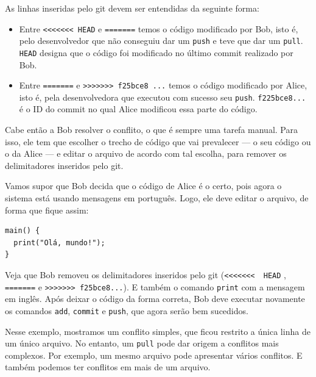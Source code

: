\documentclass[
  11pt,
  twoside]{book}
\newcommand{\passthrough}[1]{#1}
\begin{document}
As linhas inseridas pelo git devem ser entendidas da seguinte forma:

\begin{itemize}
\item
  Entre \passthrough{\lstinline!<<<<<<< HEAD!} e
  \passthrough{\lstinline!=======!} temos o código modificado por Bob,
  isto é, pelo desenvolvedor que não conseguiu dar um
  \passthrough{\lstinline!push!} e teve que dar um
  \passthrough{\lstinline!pull!}. \passthrough{\lstinline!HEAD!} designa
  que o código foi modificado no último commit realizado por Bob.
\item
  Entre \passthrough{\lstinline!=======!} e
  \passthrough{\lstinline!>>>>>>> f25bce8 ...!} temos o código
  modificado por Alice, isto é, pela desenvolvedora que executou com
  sucesso seu \passthrough{\lstinline!push!}.
  \passthrough{\lstinline!f225bce8...!} é o ID do commit no qual Alice
  modificou essa parte do código.
\end{itemize}

Cabe então a Bob resolver o conflito, o que é sempre uma tarefa manual.
Para isso, ele tem que escolher o trecho de código que vai prevalecer
--- o seu código ou o da Alice --- e editar o arquivo de acordo com tal
escolha, para remover os delimitadores inseridos pelo git.

Vamos supor que Bob decida que o código de Alice é o certo, pois agora o
sistema está usando mensagens em português. Logo, ele deve editar o
arquivo, de forma que fique assim:

\begin{lstlisting}
main() {                
  print("Olá, mundo!");                      
}                       
\end{lstlisting}

Veja que Bob removeu os delimitadores inseridos pelo git
(\passthrough{\lstinline!<<<<<<<  HEAD!} ,
\passthrough{\lstinline!=======!} e
\passthrough{\lstinline!>>>>>>> f25bce8...!}). E também o comando
\passthrough{\lstinline!print!} com a mensagem em inglês. Após deixar o
código da forma correta, Bob deve executar novamente os comandos
\passthrough{\lstinline!add!}, \passthrough{\lstinline!commit!} e
\passthrough{\lstinline!push!}, que agora serão bem sucedidos.

Nesse exemplo, mostramos um conflito simples, que ficou restrito a única
linha de um único arquivo. No entanto, um \passthrough{\lstinline!pull!}
pode dar origem a conflitos mais complexos. Por exemplo, um mesmo
arquivo pode apresentar vários conflitos. E também podemos ter conflitos
em mais de um arquivo.
\end{document}
